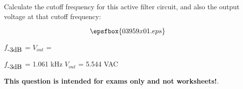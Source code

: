 

Calculate the cutoff frequency for this active filter circuit, and also the output voltage at that cutoff frequency:

$$\epsfbox{03959x01.eps}$$

$f_{\hbox{-3dB}}$ =  \hskip 150pt $V_{out}$ =







$f_{\hbox{-3dB}}$ = 1.061 kHz \hskip 100pt $V_{out}$ = 5.544 VAC







{\bf This question is intended for exams only and not worksheets!}.



